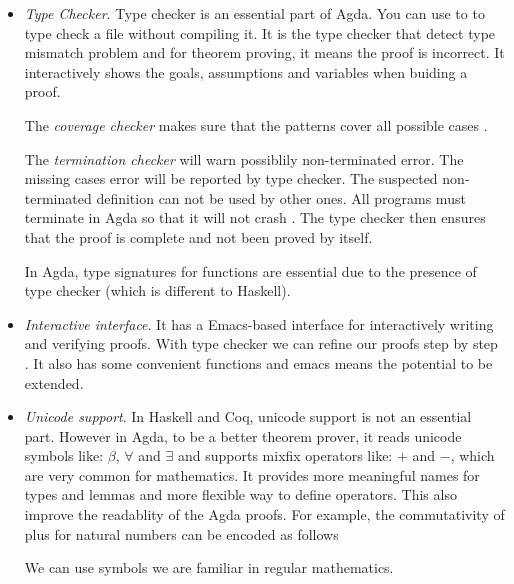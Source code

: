 \begin{itemize}
\item \textit{Type Checker}. Type checker is an essential part of Agda. You can use to to type check a file without compiling it. It is the type checker that detect type mismatch problem and for theorem proving, it means the proof is incorrect. It interactively shows the goals, assumptions and variables when buiding a proof. 

The \emph{coverage checker} makes sure that the patterns cover all possible cases \cite{aboa}. 

The \emph{termination checker} will warn possiblily non-terminated error. The missing cases error will be reported by type checker. The suspected non-terminated definition can not be used by other ones. All programs must terminate in Agda so that it will not crash \cite{tutorial}.  The type checker then ensures that the proof is complete and not been proved by itself. 

In Agda, type signatures for functions are essential due to the presence of type checker (which is different to Haskell).
 
\item \textit{Interactive interface}. It has a Emacs-based interface for interactively writing and verifying proofs.  With type checker we can refine our proofs step by step \cite{aboa}. It also has some convenient functions and emacs means the potential to be extended.

\item \textit{Unicode support}. In Haskell and Coq, unicode support is not an essential part. However in Agda, to be a better theorem prover, it reads unicode symbols like: $\beta$, $\forall$ and $\exists$ and supports mixfix operators like: $+$ and $-$, which are very common for mathematics. It provides more meaningful names for types and lemmas and more flexible way to define operators. This also improve the readablity of the Agda proofs. For example, the commutativity of plus for natural numbers can be encoded as follows

\begin{code}
\> \AgdaSymbol{:}  \AgdaSymbol{(}  \AgdaSymbol{:} \AgdaSymbol{)}   \AgdaFunction{+}    \AgdaFunction{+} \<%
\end{code}

We can use symbols we are familiar in regular mathematics.




\end{itemize}
